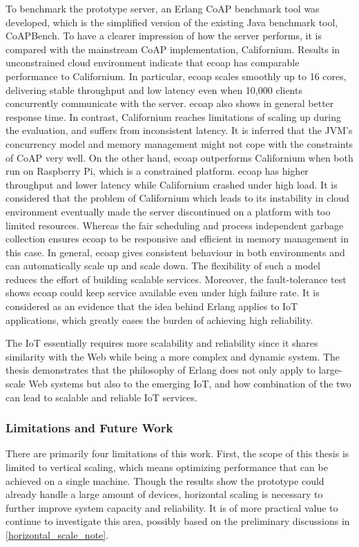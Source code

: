 To benchmark the prototype server, an Erlang CoAP benchmark tool was developed, which is the simplified version of the existing Java benchmark tool, CoAPBench. To have a clearer impression of how the server performs, it is compared with the mainstream CoAP implementation, Californium. Results in unconstrained cloud environment indicate that ecoap has comparable performance to Californium. In particular, ecoap scales smoothly up to 16 cores, delivering stable throughput and low latency even when 10,000 clients concurrently communicate with the server. ecoap also shows in general better response time. In contrast, Californium reaches limitations of scaling up during the evaluation, and suffers from inconsistent latency. It is inferred that the JVM's concurrency model and memory management might not cope with the constraints of CoAP very well. On the other hand, ecoap outperforms Californium when both run on Raspberry Pi, which is a constrained platform. ecoap has higher throughput and lower latency while Californium crashed under high load. It is considered that the problem of Californium which leads to its instability in cloud environment eventually made the server discontinued on a platform with too limited resources. Whereas the fair scheduling and process independent garbage collection ensures ecoap to be responsive and efficient in memory management in this case. In general, ecoap gives consistent behaviour in both environments and can automatically scale up and scale down. The flexibility of such a model reduces the effort of building scalable services. Moreover, the fault-tolerance test 
shows ecoap could keep service available even under high failure rate. It is considered as an evidence that the idea behind Erlang applies to IoT applications, which greatly eases the burden of achieving high reliability.

The IoT essentially requires more scalability and reliability since it shares similarity with the Web while being a more complex and dynamic system. The thesis demonstrates that the philosophy of Erlang does not only apply to large-scale Web systems but also to the emerging IoT, and how combination of the two can lead to scalable and reliable IoT services. 


\subsubsection{Limitations and Future Work}

There are primarily four limitations of this work. First, the scope of this thesis is limited to vertical scaling, which means optimizing performance that can be achieved on a single machine. Though the results show the prototype could already handle a large amount of devices, horizontal scaling is necessary to further improve system capacity and reliability. It is of more practical value to continue to investigate this area, possibly based on the preliminary discussions in \autoref{horizontal_scale_note}. 

